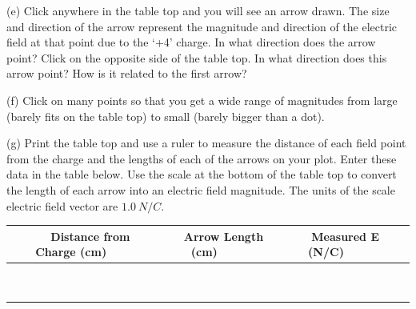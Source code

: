 (e) Click anywhere in the table top and you will see an arrow drawn.
The size and direction of the arrow represent the magnitude and direction of
the electric field at that point due to the `+4' charge.
In what direction does the arrow point?
Click on the opposite side of the table top.
In what direction does this arrow point? How is it related to the first arrow?
\vspace{15mm}

(f) Click on many points so that you get a wide range of magnitudes from large
(barely fits on the table top) to small (barely bigger than a dot).

(g) Print the table top and use a ruler to measure the distance of each field 
point from the charge and the lengths of each of the arrows on your plot. 
Enter these data in the table below. Use the scale at the bottom of the table 
top to convert the length of each arrow into an electric field magnitude.
The units of the scale electric field vector are $1.0 ~ N/C$.

\vspace{0.3cm}
{\centering \begin{tabular}{|c|c|c|c|}
\hline 
~~~Distance from Charge (cm)~~~&
~~~Arrow Length (cm)~~~&
~~~Measured E (N/C)~~~\\
\hline
\hline 
&
&
\\
\hline 
&
&
\\
\hline 
&
&
\\
\hline 
&
&
\\
\hline 
&
&
\\
\hline 
&
&
\\
\hline 
&
&
\\
\hline 
&
&
\\
\hline 
&
&
\\
\hline
\end{tabular}\par}
\vspace{0.3cm}


